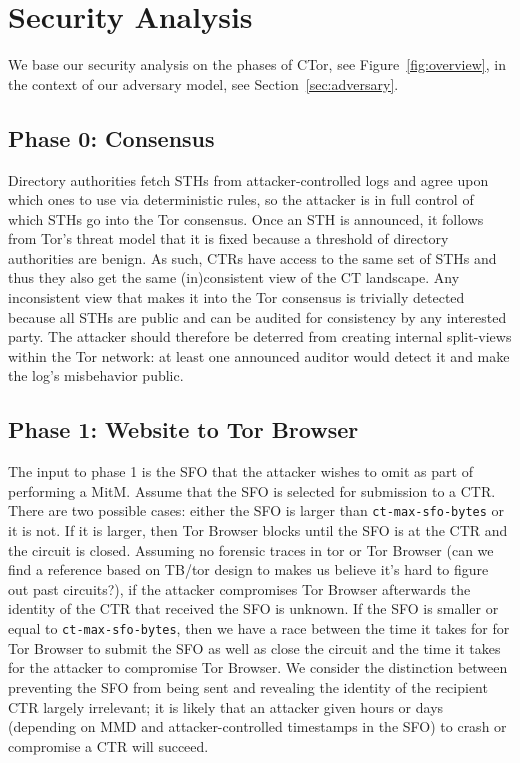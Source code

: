 \section{Security Analysis} \label{sec:security}
We base our security analysis on the phases of CTor, see
Figure~\ref{fig:overview}, in the context of our adversary model, see
Section~\ref{sec:adversary}.

\subsection{Phase 0: Consensus} \label{sec:security:phase0}
Directory authorities fetch STHs from attacker-controlled logs and agree upon
which ones to use via deterministic rules, so the attacker is in full control of
which STHs go into the Tor consensus.  Once an STH is announced, it follows from
Tor's threat model that it is fixed because a threshold of directory authorities
are benign.  As such, CTRs have access to the same set of STHs and thus they
also get the same (in)consistent view of the CT landscape. Any inconsistent view
that makes it into the Tor consensus is trivially detected because all STHs are
public and can be audited for consistency by any interested party.  The attacker
should therefore be deterred from creating internal split-views within the Tor
network: at least one announced auditor would detect it and make the log's
misbehavior public.

\subsection{Phase 1: Website to Tor Browser} \label{sec:security:phase1}
The input to phase 1 is the SFO that the attacker wishes to omit as part of
performing a MitM. Assume that the SFO is selected for submission to a CTR.
There are two possible cases: either the SFO is larger than
\texttt{ct-max-sfo-bytes} or it is not. If it is larger, then Tor Browser blocks
until the SFO is at the CTR and the circuit is closed. Assuming no forensic
traces in tor or Tor Browser (can we find a reference based on TB/tor design to
makes us believe it's hard to figure out past circuits?), if the attacker
compromises Tor Browser afterwards the identity of the CTR that received the SFO
is unknown. If the SFO is smaller or equal to \texttt{ct-max-sfo-bytes}, then we
have a race between the time it takes for for Tor Browser to submit the SFO as
well as close the circuit and the time it takes for the attacker to compromise
Tor Browser. We consider the distinction between preventing the SFO from being
sent and revealing the identity of the recipient CTR largely irrelevant; it is
likely that an attacker given hours or days (depending on MMD and
attacker-controlled timestamps in the SFO) to crash or compromise a CTR will
succeed.

